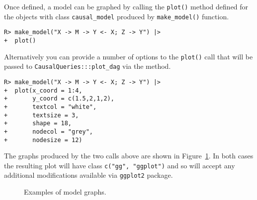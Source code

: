\documentclass[
  11pt,
  article]{jss}
\begin{document}
Once defined, a model can be graphed by calling the \texttt{plot()}
method defined for the objects with class \texttt{causal\_model}
produced by \texttt{make\_model()} function.

\begin{verbatim}
R> make_model("X -> M -> Y <- X; Z -> Y") |>
+  plot()
\end{verbatim}

Alternatively you can provide a number of options to the \texttt{plot()}
call that will be passed to \texttt{CausalQueries:::plot\_dag} via the
method.

\begin{verbatim}
R> make_model("X -> M -> Y <- X; Z -> Y") |>
+  plot(x_coord = 1:4,
+       y_coord = c(1.5,2,1,2),
+       textcol = "white",
+       textsize = 3,
+       shape = 18,
+       nodecol = "grey",
+       nodesize = 12)
\end{verbatim}

The graphs produced by the two calls above are shown in
Figure~\ref{fig-plots}. In both cases the resulting plot will have class
\texttt{c("gg",\ "ggplot")} and so will accept any additional
modifications available via \texttt{ggplot2} package.

\begin{figure}

\begin{minipage}[t]{0.50\linewidth}

{\centering 


}

\end{minipage}%
%
\begin{minipage}[t]{0.50\linewidth}

{\centering 


}

\end{minipage}%

\caption{\label{fig-plots}Examples of model graphs.}

\end{figure}
\end{document}
